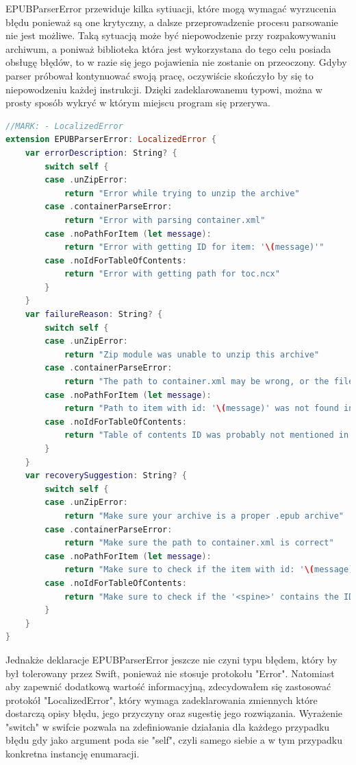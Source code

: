 EPUBParserError przewiduje kilka sytiuacji, które mogą wymagać wyrzucenia błędu ponieważ są one krytyczny, a dalsze przeprowadzenie procesu parsowanie nie jest możliwe. Taką sytuacją może być niepowodzenie przy rozpakowywaniu archiwum, a poniważ biblioteka która jest wykorzystana do tego celu posiada obsługę błędów, to w razie się jego pojawienia nie zostanie on przeoczony. Gdyby parser próbował kontynuować swoją pracę, oczywiście skończyło by się to niepowodzeniu każdej instrukcji. Dzięki zadeklarowanemu typowi, można w prosty sposób wykryć w którym miejscu program się przerywa.

\begin{lstlisting}[firstnumber=8,caption={Rozszeżenie EPUBParserError z zastosowaniem protokołu LocalizedError.},language=swift]
//MARK: - LocalizedError
extension EPUBParserError: LocalizedError {
    var errorDescription: String? {
        switch self {
        case .unZipError:
            return "Error while trying to unzip the archive"
        case .containerParseError:
            return "Error with parsing container.xml"
        case .noPathForItem (let message):
            return "Error with getting ID for item: '\(message)'"
        case .noIdForTableOfContents:
            return "Error with getting path for toc.ncx"
        }
    }
    var failureReason: String? {
        switch self {
        case .unZipError:
            return "Zip module was unable to unzip this archive"
        case .containerParseError:
            return "The path to container.xml may be wrong, or the file itself may be missing"
        case .noPathForItem (let message):
            return "Path to item with id: '\(message)' was not found in the manifest!"
        case .noIdForTableOfContents:
            return "Table of contents ID was probably not mentioned in the spine"
        }
    }
    var recoverySuggestion: String? {
        switch self {
        case .unZipError:
            return "Make sure your archive is a proper .epub archive"
        case .containerParseError:
            return "Make sure the path to container.xml is correct"
        case .noPathForItem (let message):
            return "Make sure to check if the item with id: '\(message)' is in the manifest!"
        case .noIdForTableOfContents:
            return "Make sure to check if the '<spine>' contains the ID for TOC"
        }
    }
}
\end{lstlisting}

Jednakże deklaracje EPUBParserError jeszcze nie czyni typu błędem, który by był tolerowany przez Swift, ponieważ nie stosuje protokołu "Error". Natomiast aby zapewnić dodatkową wartość informacyjną, zdecydowałem się zastosować protokół "LocalizedError", który wymaga zadeklarowania zmiennych które dostarczą opisy błędu, jego przyczyny oraz sugestię jego rozwiązania. Wyrażenie "switch" w swifcie pozwala na zdefiniowanie działania dla każdego przypadku błędu gdy jako argument poda sie "self", czyli samego siebie a w tym przypadku konkretna instancję enumaracji.

